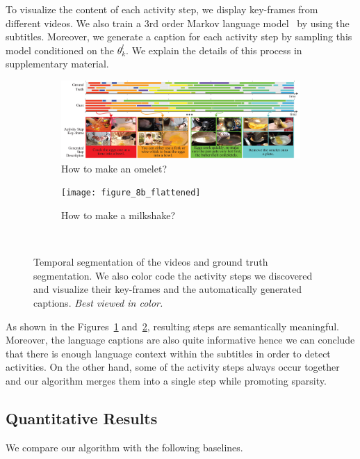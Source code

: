 To visualize the content of each activity step, we display key-frames from different videos. We also train a 3rd order Markov language model~\cite{languageModel} by using the subtitles. Moreover, we generate a caption for each activity step by sampling this model conditioned on the $\theta^l_k$. We explain the details of this process in supplementary material.

\begin{figure}[ht]
  \begin{subfigure}[b]{\textwidth}
    \includegraphics[width=\textwidth]{figure_8a_flattened}
    \vspace{-5mm}
    \caption{How to make an omelet?}
    \vspace{-1mm}
    \label{recipe:ommelette}
  \end{subfigure}

  \begin{subfigure}[b]{\textwidth}
    \texttt{[image: figure\_8b\_flattened]}
    \caption{How to make a milkshake?}
    \vspace{-3mm}
    \label{recipe:milkshake}
  \end{subfigure}~
\caption{Temporal segmentation of the videos and ground truth segmentation. We also color code the activity steps we discovered and visualize their key-frames and the automatically generated captions. \emph{Best viewed in color.}}
\label{recipe:overall}
\vspace{-3mm}
\end{figure}

As shown in the Figures~\ref{recipe:ommelette} and~\ref{recipe:milkshake}, resulting steps are semantically meaningful. Moreover, the language captions are also quite informative hence we can conclude that there is enough language context within the subtitles in order to detect activities. On the other hand, some of the activity steps always occur together and our algorithm merges them into a single step while promoting sparsity.

\subsection{Quantitative Results}
We compare our algorithm with the following baselines.

